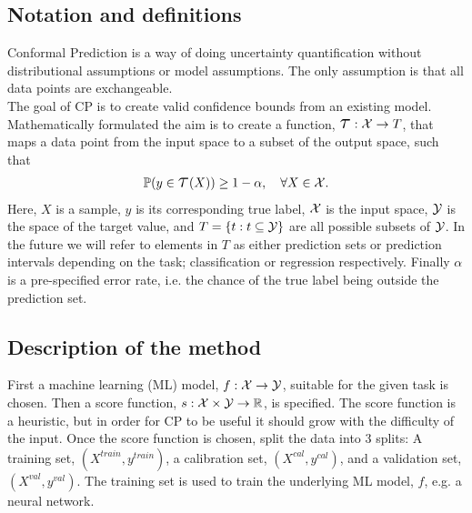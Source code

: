 \subsection*{Notation and definitions}
Conformal Prediction is a way of doing uncertainty quantification without distributional assumptions or model assumptions. The only assumption is that all data points are exchangeable.\\
%
The goal of CP is to create valid confidence bounds from an existing model. Mathematically formulated the aim is to create a function, $\Tau: \X \rightarrow T$, that maps a data point from the input space to a subset of the output space, such that
\begin{gather}
\doubleP(y\in\Tau(X)) \geq 1-\alpha, \quad \forall X\in\X.
\label{eq: coverage}
\end{gather}
Here, $X$ is a sample, $y$ is its corresponding true label, $\mathcal{X}$ is the input space, $\mathcal{Y}$ is the space of the target value, and $T = \{t:t\subseteq \mathcal{Y}\}$ are all possible subsets of $\mathcal{Y}$. In the future we will refer to elements in $T$ as either prediction sets or prediction intervals depending on the task; classification or regression respectively. Finally $\alpha$ is a pre-specified error rate, i.e. the chance of the true label being outside the prediction set.
\subsection*{Description of the method}
\label{sec: description of method}
First a machine learning (ML) model,
$f: \mathcal{X}\rightarrow \mathcal{Y}$,
suitable for the given task is chosen.
Then a score function,
$s:\mathcal{X}\times\mathcal{Y}\rightarrow\mathbb{R}$,
is specified.
The score function is a heuristic, but in order for CP to be useful it should grow with the difficulty of the input. Once the score function is chosen, split the data into 3 splits: A training set, $(X^{train}, y^{train})$, a calibration set, $(X^{cal}, y^{cal})$, and a validation set, $(X^{val}, y^{val})$. The training set is used to train the underlying ML model, $f$, e.g. a neural network.

